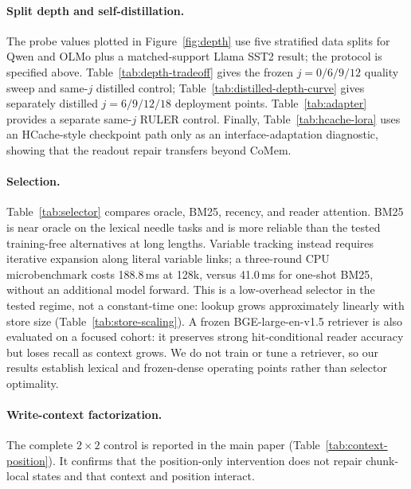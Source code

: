 \paragraph{Split depth and self-distillation.}
The probe values plotted in Figure~\ref{fig:depth} use five stratified data
splits for Qwen and OLMo plus a matched-support Llama SST2 result; the protocol
is specified above. Table~\ref{tab:depth-tradeoff} gives the frozen
$j=0/6/9/12$ quality sweep and same-$j$ distilled control;
Table~\ref{tab:distilled-depth-curve} gives separately distilled
$j=6/9/12/18$ deployment points. Table~\ref{tab:adapter} provides a separate
same-$j$ RULER control.
Finally, Table~\ref{tab:hcache-lora} uses an HCache-style checkpoint path only
as an interface-adaptation diagnostic, showing that the readout repair transfers
beyond CoMem.






\paragraph{Selection.}
Table~\ref{tab:selector} compares oracle, BM25, recency, and reader attention.
BM25 is near oracle on the lexical needle tasks and is more reliable than the
tested training-free alternatives at long lengths. Variable tracking instead
requires iterative expansion along literal variable links; a three-round CPU
microbenchmark costs 188.8\,ms at 128k, versus 41.0\,ms for one-shot BM25, without
an additional model forward. This is a low-overhead selector in the tested
regime, not a constant-time one: lookup grows approximately linearly with store
size (Table~\ref{tab:store-scaling}). A frozen BGE-large-en-v1.5 retriever is
also evaluated on a focused cohort: it preserves strong hit-conditional reader
accuracy but loses recall as context grows. We do not train or tune a retriever,
so our results establish lexical and frozen-dense operating points rather than
selector optimality.




\paragraph{Write-context factorization.}
The complete $2{\times}2$ control is reported in the main paper
(Table~\ref{tab:context-position}). It confirms that the position-only
intervention does not repair chunk-local states and that context and position
interact.

